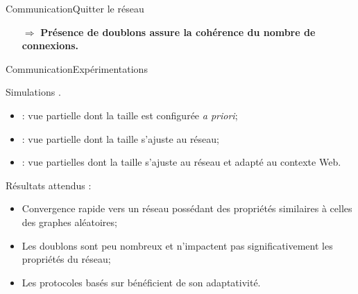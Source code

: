 \begin{frame}{Communication}{Quitter le réseau}

  \vspace{1cm}
  \large
  \begin{itemize}
  \item [$\Rightarrow$] \textbf{Présence de doublons assure la cohérence du
      nombre de connexions.}
  \end{itemize}
 
\end{frame}


\begin{frame}{Communication}{Expérimentations}

  Simulations \PEERSIM.

  \vspace{0.5cm}

  \begin{itemize}
  \item \CYCLON : vue partielle dont la taille est configurée \textit{a priori};
  \item \SCAMP : vue partielle dont la taille s'ajuste au réseau;
  \item \SPRAY : vue partielles dont la taille s'ajuste au réseau et adapté au
    contexte Web.
  \end{itemize}


  
  \vspace{0.5cm}


  Résultats attendus :
  \begin{itemize}
  \item Convergence rapide vers un réseau possédant des propriétés similaires à
    celles des graphes aléatoires;
  \item Les doublons sont peu nombreux et n'impactent pas significativement les
    propriétés du réseau;
  \item Les protocoles basés sur \SPRAY bénéficient de son adaptativité.
  \end{itemize}

\end{frame}


